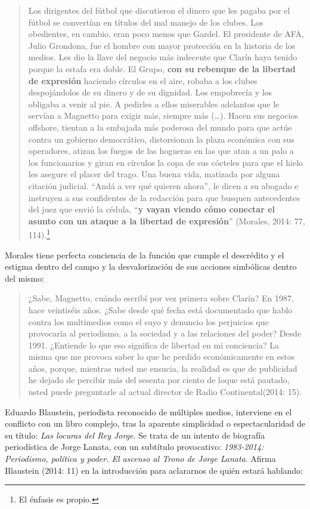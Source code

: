 \begin{quote}
Los dirigentes del fútbol que discutieron el dinero que les pagaba por el fútbol se convertían en títulos del mal manejo de los clubes. Los obedientes, en cambio, eran poco menos que Gardel. El presidente de AFA, Julio Grondona, fue el hombre con mayor protección en la historia de los medios. Les dio la llave del negocio más indecente que Clarín haya tenido porque la estafa era doble. El Grupo, \textbf{con su rebenque de la libertad de expresión} haciendo círculos en el aire, robaba a los clubes despojándolos de su dinero y de su dignidad. Los empobrecía y los obligaba a venir al pie. A pedirles a ellos miserables adelantos que le servían a Magnetto para exigir más, siempre más (\ldots). Hacen sus negocios offshore, tientan a la embajada más poderosa del mundo para que actúe contra un gobierno democrático, distorsionan la plaza económica con sus operadores, atizan los fuegos de las hogueras en las que atan a un palo a los funcionarios y giran en círculos la copa de sus cócteles para que el hielo les asegure el placer del trago. Una buena vida, matizada por alguna citación judicial. \enquote{Andá a ver qué quieren ahora}, le dicen a su abogado e instruyen a sus confidentes de la redacción para que busquen antecedentes del juez que envió la cédula, \enquote{\textbf{y vayan viendo cómo conectar el asunto con un ataque a la libertad de expresión}} (Morales, 2014: 77, 114).\footnote{El énfasis es propio.}
\end{quote}

Morales tiene perfecta conciencia de la función que cumple el descrédito y el estigma dentro del campo y la desvalorización de sus acciones simbólicas dentro del mismo:

\begin{quote}
¿Sabe, Magnetto, cuándo escribí por vez primera sobre Clarín? En 1987, hace veintiséis años. ¿Sabe desde qué fecha está documentado que hablo contra los multimedios como el suyo y denuncio los perjuicios que provocaría al periodismo, a la sociedad y a las relaciones del poder? Desde 1991. ¿Entiende lo que eso significa de libertad en mi conciencia? La misma que me provoca saber lo que he perdido económicamente en estos años, porque, mientras usted me ensucia, la realidad es que de publicidad he dejado de percibir más del sesenta por ciento de loque está pautado, usted puede preguntarle al actual director de Radio Continental(2014: 15).
\end{quote}

Eduardo Blaustein, periodista reconocido de múltiples medios, interviene en el conflicto con un libro complejo, tras la aparente simplicidad o espectacularidad de su título: \emph{Las locuras del Rey Jorge}. Se trata de un intento de biografía periodística de Jorge Lanata, con un subtítulo provocativo: \emph{1983-2014: Periodismo, política y poder. El ascenso al Trono de Jorge Lanata}. Afirma Blaustein (2014: 11) en la introducción para aclararnos de quién estará hablando:

